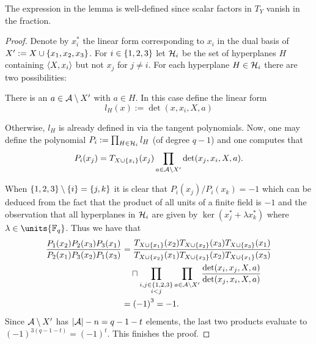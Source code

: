 \begin{remark}
    The expression in the lemma is well-defined since scalar factors in $T_Y$ vanish in the fraction.
\end{remark}

\begin{proof}
    Denote by $x_i^{\ast}$ the linear form corresponding to $x_i$ in the dual basis of $X':=X\setjoin\set{x_1,x_2,x_3}$.
    For $i\in\set{1,2,3}$ let $\mathcal{H}_i$ be the set of hyperplanes $H$ containing $\gen{X,x_i}$ but not $x_j$ for $j\neq i$.
    For each hyperplane $H\in \mathcal{H}_i$ there are two possibilities:
    \begin{casebycase}
        \item There is an $a\in\mathcal{A}\setminus X'$ with $a\in H$. In this case define the linear form
    $$
    l_H(x):=\det(x,x_i,X,a)
    $$
        \item Otherwise, $l_H$ is already defined in via the tangent polynomials.
    Now, one may define the polynomial $P_i:=\prod_{H\in \mathcal{H}_i}{l_H}$ (of degree $q-1$) and one computes that
    $$
    P_i(x_j)=T_{X\setjoin\set{x_i}}(x_j)\prod_{a\in\cA\setminus X'}{\det(x_j,x_i,X,a)}.
    $$%
    \end{casebycase}
    When $\set{1,2,3}\setminus\set{i}=\set{j,k}$ it is clear that $P_i(x_j)/P_i(x_k)=-1$ which can be deduced from the fact that the product of all units of a finite field is $-1$ and the observation that all hyperplanes in $\mathcal{H}_i$ are given by $\ker(x_j^{\ast}+\lambda x_k^{\ast})$ where $\lambda\in\units{\field{q}}$.
    Thus we have that
    \begin{align*}
        \frac{P_1(x_2)P_2(x_3)P_3(x_1)}{P_2(x_1)P_3(x_2)P_1(x_3)} &= \frac{T_{X\setjoin\set{x_1}}(x_2)T_{X\setjoin\set{x_2}}(x_3)T_{X\setjoin\set{x_3}}(x_1)}{T_{X\setjoin\set{x_2}}(x_1)T_{X\setjoin\set{x_3}}(x_2)T_{X\setjoin\set{x_1}}(x_3)}\\
        & \quad\setprod\prod_{\substack{i,j\in\set{1,2,3}\\ i<j}}\prod_{a\in\cA\setminus X'}{\frac{\det(x_i,x_j,X,a)}{\det(x_j,x_i,X,a)}}\\
        & = {(-1)}^3=-1.
    \end{align*}
    Since $\mathcal{A}\setminus X'$ has $\left|\mathcal{A}\right|-n=q-1-t$ elements, the last two products evaluate to ${(-1)}^{3(q-1-t)}={(-1)}^t$.
    This finishes the proof.
\end{proof}

